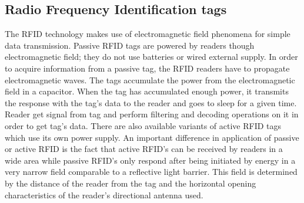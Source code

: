 \documentclass[../main.tex]{subfiles}
\begin{document}
\subsection{Radio Frequency Identification tags} %
\label{sub:rfid_tags}

The RFID technology makes use of electromagnetic field phenomena for simple data transmission. Passive RFID tags are powered by readers though electromagnetic field; they do not use batteries or wired external supply. In order to acquire information from a passive tag, the RFID readers have to propagate electromagnetic waves. The tags accumulate the power from the electromagnetic field in a capacitor. When the tag has accumulated enough power, it transmits the response with the tag's data to the reader and goes to sleep for a given time. Reader get signal from tag and perform filtering and decoding operations on it in order to get tag's data. There are also available variants of active RFID tags which use its own power supply. An important difference in application of passive or active RFID is the fact that active RFID's can be received by readers in a wide area while passive RFID's only respond after being initiated by energy in a very narrow field comparable to a reflective light barrier. This field is determined by the distance of the reader from the tag and the horizontal opening characteristics of the reader's directional antenna used.
\end{document}
